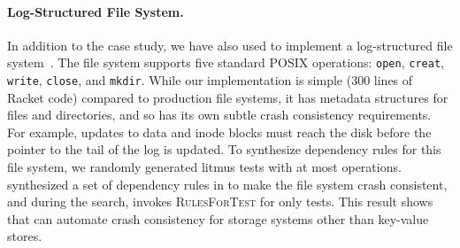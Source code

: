 \paragraph{Log-Structured File System.}
In addition to the \shardstore case study, %
we have also used \depsynth
to implement a log-structured file system~\cite{rosenblum:lfs}.
The file system supports five standard POSIX operations:
\texttt{open}, \texttt{creat}, \texttt{write}, \texttt{close}, and \texttt{mkdir}.
While our implementation is simple (300 lines of Racket code) compared to production file systems,
it has metadata structures for files and directories,
and so has its own subtle crash consistency requirements.
For example, updates to data and inode blocks must reach the
disk before the pointer to the tail of the log is updated.
To synthesize dependency rules for this file system,
we randomly generated \lfsinputtests{} litmus tests
with at most \lfsmaxops{} operations.
\depsynth synthesized a set of \lfsnumrules{} dependency rules
in \lfssynthesistime{} to make the file system crash consistent,
and during the search,
invokes \textsc{RulesForTest} for only \lfstestsused{} tests.
This result shows that \depsynth can automate crash consistency for storage systems other than key-value stores.
